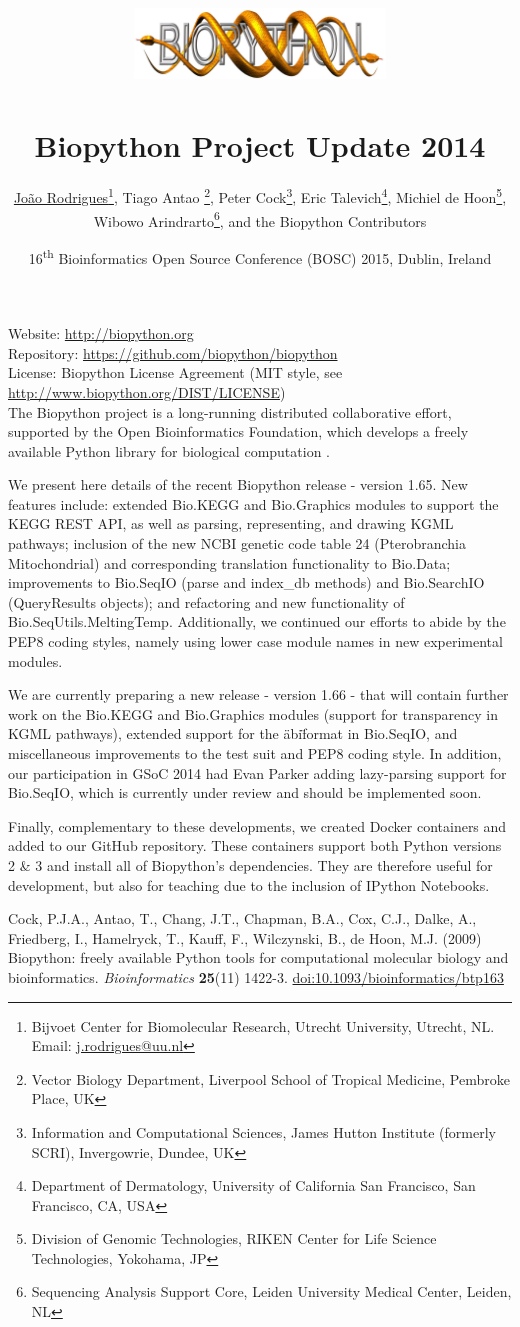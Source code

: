 \documentclass[10pt,oneside]{article}
\title{%
\vspace{-1.5in}
\includegraphics[width=0.5\textwidth]{biopython.jpg}\\
~\\Biopython Project Update 2014}
\author{
    \underline{Jo\~{a}o Rodrigues}\footnote{Bijvoet Center for Biomolecular Research, Utrecht University, Utrecht, NL. Email: \href{mailto:j.rodrigues@uu.nl}{j.rodrigues@uu.nl}},
    Tiago Antao \footnote{Vector Biology Department, Liverpool School of Tropical Medicine, Pembroke Place, UK},
    Peter Cock\footnote{Information and Computational Sciences, James Hutton Institute (formerly SCRI), Invergowrie, Dundee, UK},
    Eric Talevich\footnote{Department of Dermatology, University of California San Francisco, San Francisco, CA, USA},
    Michiel de Hoon\footnote{Division of Genomic Technologies, RIKEN Center for Life Science Technologies, Yokohama, JP},
		\\
    Wibowo Arindrarto\footnote{Sequencing Analysis Support Core, Leiden University Medical Center, Leiden, NL},
    and the Biopython Contributors}
\date{16\textsuperscript{th} Bioinformatics Open Source Conference (BOSC) 2015, Dublin, Ireland}
\begin{document}
\maketitle
\thispagestyle{empty}

\vspace{-0.2in}
\noindent
Website: \url{http://biopython.org} \\
Repository: \url{https://github.com/biopython/biopython} \\
License: Biopython License Agreement (MIT style, see \url{http://www.biopython.org/DIST/LICENSE}) \\

The Biopython project is a long-running distributed collaborative effort, 
supported by the Open Bioinformatics Foundation, which develops a freely 
available Python library for biological computation \cite{AppNote}.

We present here details of the recent Biopython release - version 1.65. New 
features include: extended Bio.KEGG and Bio.Graphics modules to support the 
KEGG REST API, as well as parsing, representing, and drawing KGML pathways; 
inclusion of the new NCBI genetic code table 24 (Pterobranchia Mitochondrial) 
and corresponding translation functionality to Bio.Data; improvements to 
Bio.SeqIO (parse and index\_db methods) and Bio.SearchIO (QueryResults objects); 
and refactoring and new functionality of Bio.SeqUtils.MeltingTemp. 
Additionally, we continued our efforts to abide by the PEP8 coding styles, 
namely using lower case module names in new experimental modules.

We are currently preparing a new release - version 1.66 - that will contain 
further work on the Bio.KEGG and Bio.Graphics modules (support for transparency 
in KGML pathways), extended support for the \"abi\" format in Bio.SeqIO, and 
miscellaneous improvements to the test suit and PEP8 coding style. In addition, 
our participation in GSoC 2014 had Evan Parker adding lazy-parsing support for 
Bio.SeqIO, which is currently under review and should be implemented soon.

Finally, complementary to these developments, we created Docker containers and 
added to our GitHub repository. These containers support both Python versions 2 
\& 3 and install all of Biopython's dependencies. They are therefore useful for 
development, but also for teaching due to the inclusion of IPython Notebooks.

\begin{thebibliography}{}

Cock, P.J.A., Antao, T., Chang, J.T., Chapman, B.A., Cox, C.J., Dalke, A., Friedberg, I., Hamelryck, T., Kauff, F., Wilczynski, B., de Hoon, M.J. (2009) Biopython: freely available Python tools for computational molecular biology and bioinformatics. {\it Bioinformatics} {\bf 25}(11) 1422-3. \href{http://dx.doi.org/10.1093/bioinformatics/btp163}{doi:10.1093/bioinformatics/btp163}

\end{thebibliography}
\end{document}
